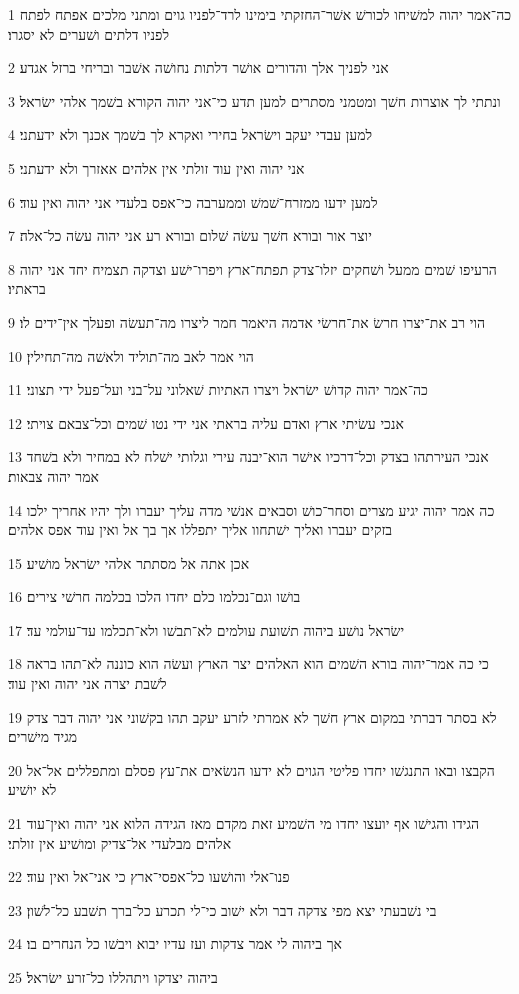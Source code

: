 \par 1 כה־אמר יהוה למשׁיחו לכורשׁ אשׁר־החזקתי בימינו לרד־לפניו גוים ומתני מלכים אפתח לפתח לפניו דלתים ושׁערים לא יסגרו׃
\par 2 אני לפניך אלך והדורים אושׁר דלתות נחושׁה אשׁבר ובריחי ברזל אגדע׃
\par 3 ונתתי לך אוצרות חשׁך ומטמני מסתרים למען תדע כי־אני יהוה הקורא בשׁמך אלהי ישׂראל׃
\par 4 למען עבדי יעקב וישׂראל בחירי ואקרא לך בשׁמך אכנך ולא ידעתני׃
\par 5 אני יהוה ואין עוד זולתי אין אלהים אאזרך ולא ידעתני׃
\par 6 למען ידעו ממזרח־שׁמשׁ וממערבה כי־אפס בלעדי אני יהוה ואין עוד׃
\par 7 יוצר אור ובורא חשׁך עשׂה שׁלום ובורא רע אני יהוה עשׂה כל־אלה׃
\par 8 הרעיפו שׁמים ממעל ושׁחקים יזלו־צדק תפתח־ארץ ויפרו־ישׁע וצדקה תצמיח יחד אני יהוה בראתיו׃
\par 9 הוי רב את־יצרו חרשׂ את־חרשׂי אדמה היאמר חמר ליצרו מה־תעשׂה ופעלך אין־ידים לו׃
\par 10 הוי אמר לאב מה־תוליד ולאשׁה מה־תחילין׃
\par 11 כה־אמר יהוה קדושׁ ישׂראל ויצרו האתיות שׁאלוני על־בני ועל־פעל ידי תצוני׃
\par 12 אנכי עשׂיתי ארץ ואדם עליה בראתי אני ידי נטו שׁמים וכל־צבאם צויתי׃
\par 13 אנכי העירתהו בצדק וכל־דרכיו אישׁר הוא־יבנה עירי וגלותי ישׁלח לא במחיר ולא בשׁחד אמר יהוה צבאות׃
\par 14 כה אמר יהוה יגיע מצרים וסחר־כושׁ וסבאים אנשׁי מדה עליך יעברו ולך יהיו אחריך ילכו בזקים יעברו ואליך ישׁתחוו אליך יתפללו אך בך אל ואין עוד אפס אלהים׃
\par 15 אכן אתה אל מסתתר אלהי ישׂראל מושׁיע׃
\par 16 בושׁו וגם־נכלמו כלם יחדו הלכו בכלמה חרשׁי צירים׃
\par 17 ישׂראל נושׁע ביהוה תשׁועת עולמים לא־תבשׁו ולא־תכלמו עד־עולמי עד׃
\par 18 כי כה אמר־יהוה בורא השׁמים הוא האלהים יצר הארץ ועשׂה הוא כוננה לא־תהו בראה לשׁבת יצרה אני יהוה ואין עוד׃
\par 19 לא בסתר דברתי במקום ארץ חשׁך לא אמרתי לזרע יעקב תהו בקשׁוני אני יהוה דבר צדק מגיד מישׁרים׃
\par 20 הקבצו ובאו התנגשׁו יחדו פליטי הגוים לא ידעו הנשׂאים את־עץ פסלם ומתפללים אל־אל לא יושׁיע׃
\par 21 הגידו והגישׁו אף יועצו יחדו מי השׁמיע זאת מקדם מאז הגידה הלוא אני יהוה ואין־עוד אלהים מבלעדי אל־צדיק ומושׁיע אין זולתי׃
\par 22 פנו־אלי והושׁעו כל־אפסי־ארץ כי אני־אל ואין עוד׃
\par 23 בי נשׁבעתי יצא מפי צדקה דבר ולא ישׁוב כי־לי תכרע כל־ברך תשׁבע כל־לשׁון׃
\par 24 אך ביהוה לי אמר צדקות ועז עדיו יבוא ויבשׁו כל הנחרים בו׃
\par 25 ביהוה יצדקו ויתהללו כל־זרע ישׂראל׃

